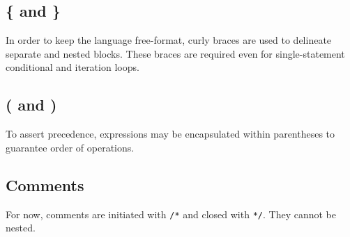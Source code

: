 		\subsection{\{ and \}}
			In order to keep the language free-format, curly braces are used to delineate separate and nested blocks. These braces are required even for single-statement conditional and iteration loops.
		\subsection{( and )}
			To assert precedence, expressions may be encapsulated within parentheses to guarantee order of operations. 
		\subsection{Comments}
			For now, comments are initiated with \texttt{/*} and closed with \texttt{*/}. They cannot be nested.
